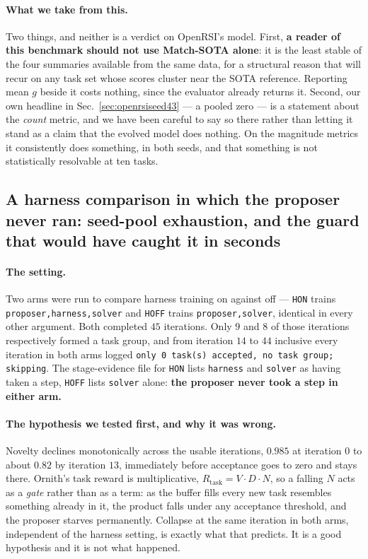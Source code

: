 \paragraph{What we take from this.}
Two things, and neither is a verdict on OpenRSI's model. First, \textbf{a reader of this
benchmark should not use Match-SOTA alone}: it is the least stable of the four summaries
available from the same data, for a structural reason that will recur on any task set whose
scores cluster near the SOTA reference. Reporting mean $g$ beside it costs nothing, since the
evaluator already returns it. Second, our own headline in Sec.~\ref{sec:openrsiseed43} --- a
pooled zero --- is a statement about the \emph{count} metric, and we have been careful to say
so there rather than letting it stand as a claim that the evolved model does nothing. On the
magnitude metrics it consistently does something, in both seeds, and that something is not
statistically resolvable at ten tasks.

\subsection{A harness comparison in which the proposer never ran: seed-pool exhaustion, and
the guard that would have caught it in seconds}
\label{sec:seedpool}

\paragraph{The setting.} Two arms were run to compare harness training on against off ---
\texttt{HON} trains \texttt{proposer,harness,solver} and \texttt{HOFF} trains
\texttt{proposer,solver}, identical in every other argument. Both completed $45$ iterations.
Only $9$ and $8$ of those iterations respectively formed a task group, and from iteration $14$
to $44$ inclusive every iteration in both arms logged \texttt{only 0 task(s) accepted, no task
group; skipping}. The stage-evidence file for \texttt{HON} lists \texttt{harness} and
\texttt{solver} as having taken a step, \texttt{HOFF} lists \texttt{solver} alone:
\textbf{the proposer never took a step in either arm.}

\paragraph{The hypothesis we tested first, and why it was wrong.} Novelty declines
monotonically across the usable iterations, $0.985$ at iteration $0$ to about $0.82$ by
iteration $13$, immediately before acceptance goes to zero and stays there. Ornith's task
reward is multiplicative, $R_{\text{task}} = V \cdot D \cdot N$, so a falling $N$ acts as a
\emph{gate} rather than as a term: as the buffer fills every new task resembles something
already in it, the product falls under any acceptance threshold, and the proposer starves
permanently. Collapse at the same iteration in both arms, independent of the harness setting,
is exactly what that predicts. It is a good hypothesis and it is not what happened.

